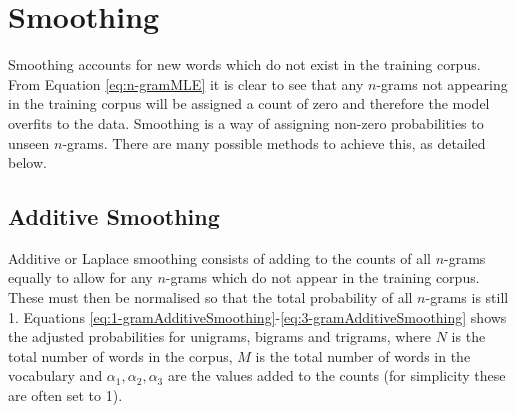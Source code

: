 


%


\section{Smoothing} \label{sec:smoothing}

Smoothing accounts for new words which do not exist in the training corpus. From Equation \ref{eq:n-gramMLE} it is clear to see that any $n$-grams not appearing in the training corpus will be assigned a count of zero and therefore the model overfits to the data. Smoothing is a way of assigning non-zero probabilities to unseen $n$-grams. There are many possible methods to achieve this, as detailed below.

\subsection{Additive Smoothing} \label{sec:additiveSmoothing}

Additive or Laplace smoothing consists of adding to the counts of all $n$-grams equally to allow for any $n$-grams which do not appear in the training corpus. These must then be normalised so that the total probability of all $n$-grams is still 1. Equations \ref{eq:1-gramAdditiveSmoothing}-\ref{eq:3-gramAdditiveSmoothing} shows the adjusted probabilities for unigrams, bigrams and trigrams, where $N$ is the total number of words in the corpus, $M$ is the total number of words in the vocabulary and $\alpha_{1}, \alpha_{2}, \alpha_{3}$ are the values added to the counts (for simplicity these are often set to 1).

